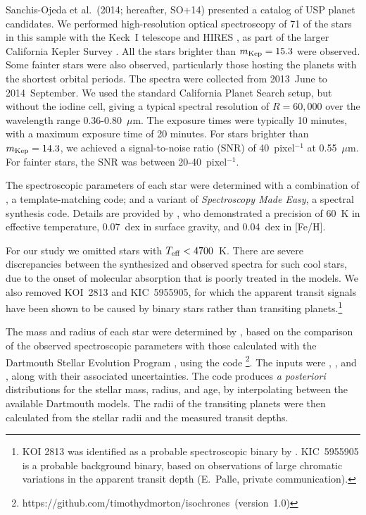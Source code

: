 \documentclass[twocolumn]{aastex6}
\begin{document}
Sanchis-Ojeda et al.~(2014; hereafter, SO+14) presented a catalog of
USP planet candidates. We performed high-resolution optical
spectroscopy of 71 of the stars in this sample with the Keck~I
telescope and HIRES \citep{Vogt+1994}, as part of the larger
California Kepler Survey \citep[CKS;][]{Petigura+2017}. All the stars
brighter than $m_{\rm Kep} = 15.3$ were observed. Some fainter stars
were also observed, particularly those hosting the planets with the
shortest orbital periods. The spectra were collected from 2013~June to
2014~September. We used the standard California Planet Search setup,
but without the iodine cell, giving a typical spectral resolution of
$R=60,000$ over the wavelength range 0.36-0.80~$\mu$m. The exposure
times were typically 10 minutes, with a maximum exposure time of 20
minutes. For stars brighter than $m_{\rm Kep} = 14.3$, we achieved a
signal-to-noise ratio (SNR) of 40~pixel$^{-1}$ at 0.55~$\mu$m.  For
fainter stars, the SNR was between 20-40~pixel$^{-1}$.

The spectroscopic parameters of each star were determined with a
combination of \SpecMatch, a template-matching code; and a variant of
{\it Spectroscopy Made Easy}, a spectral synthesis code. Details are
provided by \citet{Petigura+2017}, who demonstrated a precision of
60~K in effective temperature, 0.07~dex in surface gravity, and
0.04~dex in [Fe/H].

For our study we omitted stars with $T_{\rm eff}<4700$~K. There are
severe discrepancies between the synthesized and observed spectra for
such cool stars, due to the onset of molecular absorption that is
poorly treated in the \citet{Coelho+2005} models. We also removed
KOI~2813 and KIC~5955905, for which the apparent transit signals have
been shown to be caused by binary stars rather than transiting
planets.\footnote{KOI 2813 was identified as a probable spectroscopic
  binary by \citet{Kolbl+2015}.  KIC~5955905 is a probable background
  binary, based on observations of large chromatic variations in the
  apparent transit depth (E.~Palle, private communication).}

The mass and radius of each star were determined by
\citet{Johnson+2017}, based on the comparison of the observed
spectroscopic parameters with those calculated with the Dartmouth
Stellar Evolution Program \citep{Dotter+2008}, using the \isochrones
code \citep{Morton+2016}\footnote{
  https://github.com/timothydmorton/isochrones~(version~1.0)}. The
inputs were \teff, \logg, and \fe, along with their associated
uncertainties. The code produces {\it a posteriori} distributions for
the stellar mass, radius, and age, by interpolating between the
available Dartmouth models.  The radii of the transiting planets were
then calculated from the stellar radii and the measured transit
depths.
\end{document}
